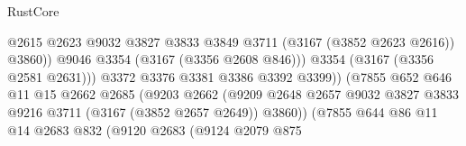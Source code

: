 \begin{lexlean}{RustCore}
\begin{coremodule}
                                                  @2615
                                                  @2623
                                                  @9032
                                                  @3827
                                                  @3833
                                                  @3849
                                                  @3711
                                                  (@3167 (@3852 @2623 @2616))
                                                  @3860))
                                              @9046
                                              @3354
                                              (@3167 (@3356 @2608 @846)))
                                            @3354
                                            (@3167 (@3356 @2581 @2631)))
                                          @3372
                                          @3376
                                          @3381
                                          @3386
                                          @3392
                                          @3399))
                                      (@7855
                                        @652
                                        @646
                                        @11
                                        @15
                                        @2662
                                        @2685
                                        (@9203
                                          @2662
                                          (@9209
                                            @2648
                                            @2657
                                            @9032
                                            @3827
                                            @3833
                                            @9216
                                            @3711
                                            (@3167 (@3852 @2657 @2649))
                                            @3860))
                                        (@7855
                                          @644
                                          @86
                                          @11
                                          @14
                                          @2683
                                          @832
                                          (@9120
                                            @2683
                                            (@9124
                                              @2079
                                              @875

\end{coremodule}
\end{lexlean}
